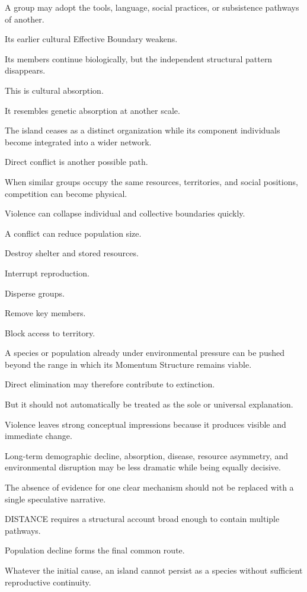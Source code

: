 A group may adopt the tools, language, social practices, or subsistence pathways of another.

Its earlier cultural Effective Boundary weakens.

Its members continue biologically, but the independent structural pattern disappears.

This is cultural absorption.

It resembles genetic absorption at another scale.

The island ceases as a distinct organization while its component individuals become integrated into a wider network.

Direct conflict is another possible path.

When similar groups occupy the same resources, territories, and social positions, competition can become physical.

Violence can collapse individual and collective boundaries quickly.

A conflict can reduce population size.

Destroy shelter and stored resources.

Interrupt reproduction.

Disperse groups.

Remove key members.

Block access to territory.

A species or population already under environmental pressure can be pushed beyond the range in which its Momentum Structure remains viable.

Direct elimination may therefore contribute to extinction.

But it should not automatically be treated as the sole or universal explanation.

Violence leaves strong conceptual impressions because it produces visible and immediate change.

Long-term demographic decline, absorption, disease, resource asymmetry, and environmental disruption may be less dramatic while being equally decisive.

The absence of evidence for one clear mechanism should not be replaced with a single speculative narrative.

DISTANCE requires a structural account broad enough to contain multiple pathways.

Population decline forms the final common route.

Whatever the initial cause, an island cannot persist as a species without sufficient reproductive continuity.

